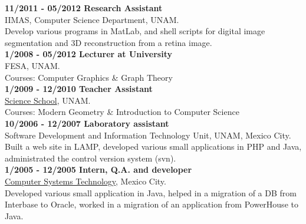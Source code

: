 \documentclass[letterpaper,10pt]{article}
\begin{document}
\begin{minipage}{0.5\textwidth}
\textbf{11/2011 - 05/2012 Research Assistant} \\
IIMAS, Computer Science Department, UNAM. \\
Develop various programs in MatLab, and shell scripts for digital image segmentation and 3D reconstruction from a retina image. \\

\textbf{1/2008 - 05/2012 Lecturer at University} \\
FESA, UNAM. \\
Courses: Computer Graphics \& Graph Theory \\

\textbf{1/2009 - 12/2010 Teacher Assistant} \\
\href{http://www.fciencias.unam.mx/}{Science School}, UNAM. \\
Courses: Modern Geometry \& Introduction to Computer Science \\

\textbf{10/2006 - 12/2007 Laboratory assistant} \\
Software Development and Information Technology Unit, UNAM, Mexico City. \\
Built a web site in LAMP, developed various small applications in PHP and Java, administrated the control version system (svn). \\

\textbf{1/2005 - 12/2005 Intern, Q.A. and developer} \\
\href{http://www.tsc.com.mx/}{Computer Systems Technology}, Mexico City. \\
Developed various small application in Java, helped in a migration of a DB from Interbase to Oracle, worked in a migration of an application from PowerHouse to Java. \\

\end{minipage}
%
\hspace{0.05\textwidth}
%
\end{document}
